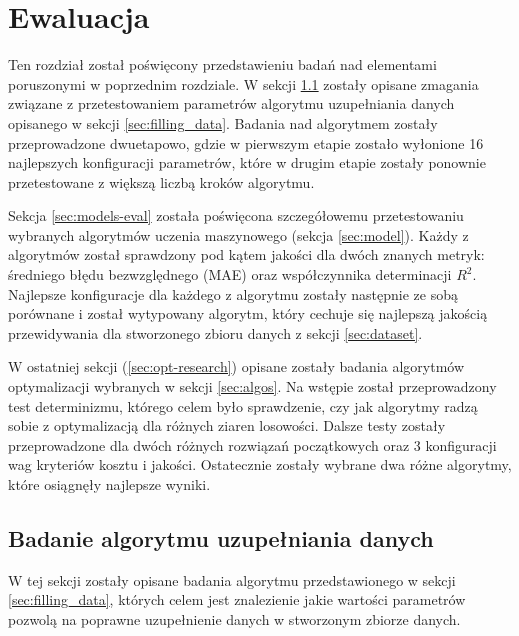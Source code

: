 
\chapter{Ewaluacja} \label{chap:evaluation}
Ten rozdział został poświęcony przedstawieniu badań nad elementami poruszonymi w poprzednim rozdziale. W sekcji \ref{sec:filling-research} zostały opisane zmagania związane z przetestowaniem parametrów algorytmu uzupełniania danych opisanego w sekcji \ref{sec:filling_data}. Badania nad algorytmem zostały przeprowadzone dwuetapowo, gdzie w pierwszym etapie zostało wyłonione 16 najlepszych konfiguracji parametrów, które w drugim etapie zostały ponownie przetestowane z większą liczbą kroków algorytmu.

Sekcja \ref{sec:models-eval} została poświęcona szczegółowemu przetestowaniu wybranych algorytmów uczenia maszynowego (sekcja \ref{sec:model}). Każdy z algorytmów został sprawdzony pod kątem jakości dla dwóch znanych metryk: średniego błędu bezwzględnego (MAE) oraz współczynnika determinacji $R^{2}$. Najlepsze konfiguracje dla każdego z algorytmu zostały następnie ze sobą porównane i został wytypowany algorytm, który cechuje się najlepszą jakością przewidywania dla stworzonego zbioru danych z sekcji \ref{sec:dataset}.

W ostatniej sekcji (\ref{sec:opt-research}) opisane zostały badania algorytmów optymalizacji wybranych w sekcji \ref{sec:algos}. Na wstępie został przeprowadzony test determinizmu, którego celem było sprawdzenie, czy jak algorytmy radzą sobie z optymalizacją dla różnych ziaren losowości. Dalsze testy zostały przeprowadzone dla dwóch różnych rozwiązań początkowych oraz 3 konfiguracji wag kryteriów kosztu i jakości. Ostatecznie zostały wybrane dwa różne algorytmy, które osiągnęły najlepsze wyniki.

\section{Badanie algorytmu uzupełniania danych}\label{sec:filling-research}
W tej sekcji zostały opisane badania algorytmu przedstawionego w sekcji \ref{sec:filling_data}, których celem jest znalezienie jakie wartości parametrów pozwolą na poprawne uzupełnienie danych w stworzonym zbiorze danych. 

